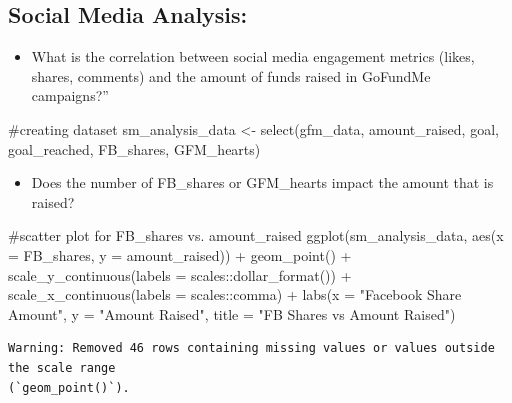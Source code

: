\documentclass[
  letterpaper,
  DIV=11,
  numbers=noendperiod]{scrartcl}
\newenvironment{Shaded}{\begin{snugshade}}{\end{snugshade}}
\newcommand{\AttributeTok}[1]{\textcolor[rgb]{0.40,0.45,0.13}{#1}}
\newcommand{\CommentTok}[1]{\textcolor[rgb]{0.37,0.37,0.37}{#1}}
\newcommand{\FunctionTok}[1]{\textcolor[rgb]{0.28,0.35,0.67}{#1}}
\newcommand{\NormalTok}[1]{\textcolor[rgb]{0.00,0.23,0.31}{#1}}
\newcommand{\OtherTok}[1]{\textcolor[rgb]{0.00,0.23,0.31}{#1}}
\newcommand{\SpecialCharTok}[1]{\textcolor[rgb]{0.37,0.37,0.37}{#1}}
\newcommand{\StringTok}[1]{\textcolor[rgb]{0.13,0.47,0.30}{#1}}
\providecommand{\tightlist}{%
  \setlength{\itemsep}{0pt}\setlength{\parskip}{0pt}}\usepackage{longtable,booktabs,array}
\begin{document}
\hypertarget{social-media-analysis}{%
\subsection{Social Media Analysis:}\label{social-media-analysis}}

\begin{itemize}
\tightlist
\item
  What is the correlation between social media engagement metrics
  (likes, shares, comments) and the amount of funds raised in GoFundMe
  campaigns?''
\end{itemize}

\begin{Shaded}
\begin{Highlighting}[]
\CommentTok{\#creating dataset }
\NormalTok{sm\_analysis\_data }\OtherTok{\textless{}{-}} \FunctionTok{select}\NormalTok{(gfm\_data, amount\_raised, goal, goal\_reached, FB\_shares, GFM\_hearts)}
\end{Highlighting}
\end{Shaded}

\begin{itemize}
\tightlist
\item
  Does the number of FB\_shares or GFM\_hearts impact the amount that is
  raised?
\end{itemize}

\begin{Shaded}
\begin{Highlighting}[]
\CommentTok{\#scatter plot for FB\_shares vs. amount\_raised }
\FunctionTok{ggplot}\NormalTok{(sm\_analysis\_data, }\FunctionTok{aes}\NormalTok{(}\AttributeTok{x =}\NormalTok{ FB\_shares, }\AttributeTok{y =}\NormalTok{ amount\_raised)) }\SpecialCharTok{+}
  \FunctionTok{geom\_point}\NormalTok{() }\SpecialCharTok{+}
  \FunctionTok{scale\_y\_continuous}\NormalTok{(}\AttributeTok{labels =}\NormalTok{ scales}\SpecialCharTok{::}\FunctionTok{dollar\_format}\NormalTok{()) }\SpecialCharTok{+}
  \FunctionTok{scale\_x\_continuous}\NormalTok{(}\AttributeTok{labels =}\NormalTok{ scales}\SpecialCharTok{::}\NormalTok{comma) }\SpecialCharTok{+}
  \FunctionTok{labs}\NormalTok{(}\AttributeTok{x =} \StringTok{"Facebook Share Amount"}\NormalTok{, }\AttributeTok{y =} \StringTok{"Amount Raised"}\NormalTok{, }\AttributeTok{title =} \StringTok{"FB Shares vs Amount Raised"}\NormalTok{)}
\end{Highlighting}
\end{Shaded}

\begin{verbatim}
Warning: Removed 46 rows containing missing values or values outside the scale range
(`geom_point()`).
\end{verbatim}
\end{document}
